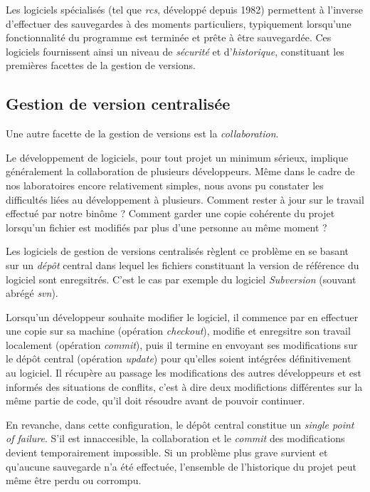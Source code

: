 \documentclass[11pt,a4paper]{article}
\begin{document}
Les logiciels spécialisés (tel que \textit{rcs}, développé depuis 1982) permettent à l'inverse d'effectuer des sauvegardes à des moments particuliers, typiquement lorsqu'une fonctionnalité du programme est terminée et prête à être sauvegardée. Ces logiciels fournissent ainsi un niveau de \textit{sécurité} et d'\textit{historique}, constituant les premières facettes de la gestion de versions.

\subsection{Gestion de version centralisée}

Une autre facette de la gestion de versions est la \textit{collaboration}. 

Le développement de logiciels, pour tout projet un minimum sérieux, implique généralement la collaboration de plusieurs développeurs. Même dans le cadre de nos laboratoires encore relativement simples, nous avons pu constater les difficultés liées au développement à plusieurs. Comment rester à jour sur le travail effectué par notre binôme ? Comment garder une copie cohérente du projet lorsqu'un fichier est modifiés par plus d'une personne au même moment ?

Les logiciels de gestion de versions centralisés règlent ce problème en se basant sur un \textit{dépôt} central dans lequel les fichiers constituant la version de référence du logiciel sont enregsitrés. C'est le cas par exemple du logiciel \textit{Subversion} (souvant abrégé \textit{svn}).

Lorsqu'un développeur souhaite modifier le logiciel, il commence par en effectuer une copie sur sa machine (opération \textit{checkout}), modifie et enregsitre son travail localement (opération \textit{commit}), puis il termine en envoyant ses modifications sur le dépôt central (opération \textit{update}) pour qu'elles soient intégrées définitivement au logiciel. Il récupère au passage les modifications des autres développeurs et est informés des situations de conflits, c'est à dire deux modifictions différentes sur la même partie de code, qu'il doit résoudre avant de pouvoir continuer.

En revanche, dans cette configuration, le dépôt central constitue un \textit{single point of failure}. S'il est innaccesible, la collaboration et le \textit{commit} des modifications devient temporairement impossible. Si un problème plus grave survient et qu'aucune sauvegarde n'a été effectuée, l'ensemble de l'historique du projet peut même être perdu ou corrompu.
\end{document}
